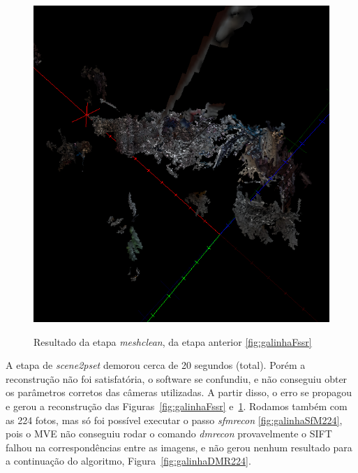 \begin{figure}[!h]
	\centering
		\caption{%
	Resultado da etapa \emph{meshclean}, da etapa anterior \ref{fig:galinhaFssr}
	}
	\includegraphics[width=0.7\linewidth]{figs/galinhameshclean.png}
		\label{fig:galinhaMeshClean}
\end{figure}

A etapa de \emph{scene2pset} demorou cerca de 20 segundos (total). Porém
a reconstrução não foi satisfatória, o software se confundiu, e
não conseguiu obter os parâmetros corretos das câmeras utilizadas. A partir
disso, o erro se propagou e gerou a reconstrução das Figuras~\ref{fig:galinhaFssr}
e~\ref{fig:galinhaMeshClean}.  Rodamos também com as 224 fotos, mas só foi possível
executar o passo \emph{sfmrecon} \ref{fig:galinhaSfM224}, pois o MVE não
conseguiu rodar o comando \emph{dmrecon} provavelmente o SIFT falhou na correspondências entre as imagens, e não gerou nenhum
resultado para a continuação do algoritmo, Figura~\ref{fig:galinhaDMR224}.



